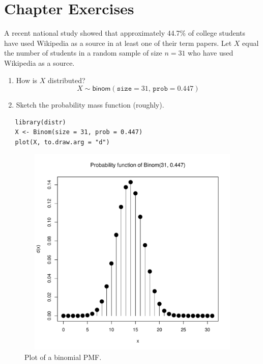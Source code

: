 \documentclass[captions=tableheading]{scrbook}
\begin{document}
\newpage{}
\section{Chapter Exercises}
\label{sec-1-8}


\setcounter{thm}{0}

\begin{xca}
A recent national study showed that approximately 44.7\% of college students have used Wikipedia as a source in at least one of their term papers. Let \(X\) equal the number of students in a random sample of size \(n=31\) who have used Wikipedia as a source. 

\begin{enumerate}
\item How is \(X\) distributed? 
   \[
   X\sim\mathsf{binom}(\mathtt{size}=31,\,\mathtt{prob}=0.447)
   \]
\item Sketch the probability mass function (roughly).
\end{enumerate}


\begin{verbatim}
   library(distr)
   X <- Binom(size = 31, prob = 0.447)
   plot(X, to.draw.arg = "d")
\end{verbatim}
   


   \begin{figure}[ht!]
	  \includegraphics[width=5in, height=4in]{img/binomdxca.pdf}
	  \caption[Plot of a binomial PMF]{\small Plot of a binomial PMF.}
	  \label{fig:binomdxca}
	\end{figure}


\end{xca}
\end{document}
